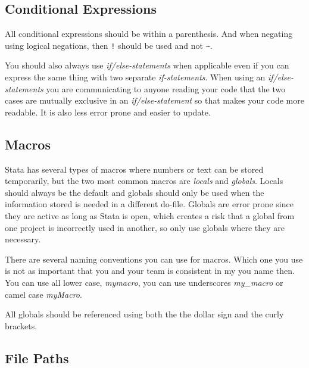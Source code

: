 
\subsection{Conditional Expressions}

All conditional expressions should be within a parenthesis. And when negating using logical negations,
then \verb|!| should be used and not \verb|~|.


You should also always use \textit{if/else-statements} when applicable even if you can express the same
thing with two separate \textit{if-statements}. When using an \textit{if/else-statements} you are
communicating to anyone reading your code that the two cases are mutually exclusive in an \textit{if/else-statement} 
so that makes your code more readable. It is also less error prone and easier to update.


\subsection{Macros}

Stata has several types of macros where numbers or text can be stored temporarily, but the two most common
macros are \textit{locals} and \textit{globals}. Locals should always be the default and globals should only 
be used when the information stored is needed in a different do-file. Globals are error prone since they are 
active as long as Stata is open, which creates a risk that a global from one project is incorrectly used in 
another, so only use globals where they are necessary.

There are several naming conventions you can use for macros. Which one you use is not as important that you 
and your team is consistent in my you name then. You can use all lower case, \textit{mymacro}, you can use 
underscores \textit{my\_macro} or camel case \textit{myMacro}.

All globals should be referenced using both the the dollar sign and the curly brackets.


\subsection{File Paths}

